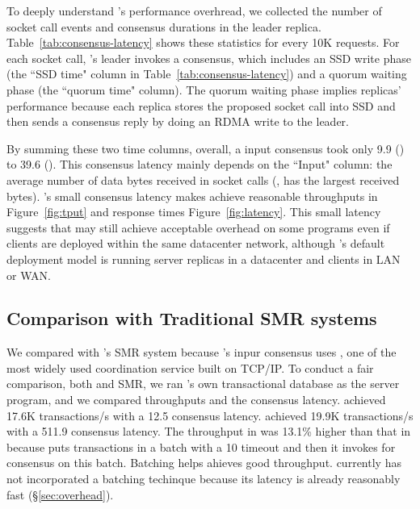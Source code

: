 
To deeply understand \xxx's performance overhread, we collected the number of 
socket call events and consensus durations in the leader replica. 
Table~\ref{tab:consensus-latency} shows these statistics for every 10K requests. 
For each socket call, \xxx's leader invokes a consensus, which includes an SSD 
write phase (the ``SSD time" column in Table~\ref{tab:consensus-latency}) and a 
quorum waiting phase (the ``quorum time" column). The quorum waiting phase 
implies replicas' performance because each replica stores the proposed socket 
call into SSD and then sends a consensus reply by doing an RDMA write to the 
leader. 

By summing these two time columns, overall, a \xxx input consensus took only 
9.9 \us (\redis) to 39.6 \us (\mongodb). This consensus latency mainly depends 
on the ``Input" column: the average number of data bytes received in socket 
calls (\eg, \mongodb has the largest received bytes). \xxx's small consensus 
latency makes \xxx achieve reasonable throughputs in Figure~\ref{fig:tput} and 
response times Figure~\ref{fig:latency}. This small latency suggests that \xxx 
may still achieve acceptable overhead on some programs even if clients are 
deployed within the same datacenter network, although \xxx's default deployment 
model is running server replicas in a datacenter and clients in LAN or WAN.

\subsection{Comparison with Traditional SMR systems} \label{sec:compare}

We compared \xxx with \calvin's SMR system because \calvin's inpur consensus 
uses \zookeeper, one of the most widely used coordination service built on 
TCP/IP. To conduct a fair comparison, both \xxx and \calvin SMR, we ran 
\calvin's own transactional database as the server program, and we compared 
throughputs and the consensus latency. \xxx achieved 17.6K transactions/s with a 
12.5 \us consensus latency. \calvin achieved 19.9K transactions/s with a 511.9 
\us consensus latency. The throughput in \calvin was 13.1\% higher than that in 
\xxx because \calvin puts transactions in a batch with a 10 \ms timeout and then 
it invokes \zookeeper for consensus on this batch. Batching helps \calvin 
ahieves good throughput. \xxx currently has not incorporated a batching 
techinque because its latency is already reasonably fast (\S\ref{sec:overhead}).

